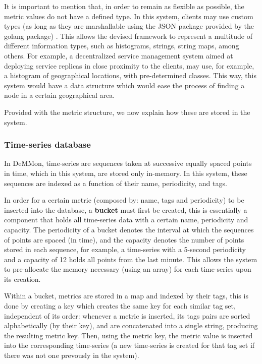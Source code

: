 It is important to mention that, in order to remain as flexible as possible, the metric values do not have a defined type. In this system, clients may use custom types (as long as they are marshallable using the JSON package provided by the golang package) . This allows the devised framework to represent a multitude of different information types, such as histograms, strings, string maps, among others. For example, a decentralized service management system aimed at deploying service replicas in close proximity to the clients, may use, for example, a histogram of geographical locations, with pre-determined classes. This way, this system would have a data structure which would ease the process of finding a node in a certain geographical area.

Provided with the metric structure, we now explain how these are stored in the system. 

\subsubsection{Time-series database}

In DeMMon, time-series are sequences taken at successive equally spaced points in time, which in this system, are stored only in-memory. In this system, these sequences are indexed as a function of their name, periodicity, and tags.

In order for a certain metric (composed by: name, tags and periodicity) to be inserted into the database, a \textbf{bucket} must first be created, this is essentially a component that holds all time-series data with a certain name, periodicity and capacity. The periodicity of a bucket denotes the interval at which the sequences of points are spaced (in time), and the capacity denotes the number of points stored in each sequence, for example, a time-series with a 5-second periodicity and a capacity of 12 holds all points from the last minute. This allows the system to pre-allocate the memory necessary (using an array) for each time-series upon its creation.

Within a bucket, metrics are stored in a map and indexed by their tags, this is done by creating a key which creates the same key for each similar tag set, independent of its order: whenever a metric is inserted, its tags pairs are sorted alphabetically (by their key), and are concatenated into a single string, producing the resulting metric key. Then, using the metric key, the metric value is inserted into the corresponding time-series (a new time-series is created for that tag set if there was not one prevously in the system).

